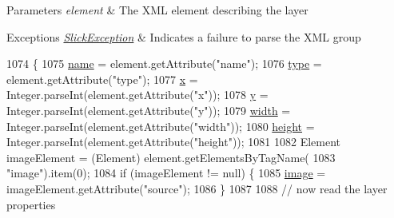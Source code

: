 \begin{DoxyParams}{Parameters}
{\em element} & The X\+ML element describing the layer \\
\hline
\end{DoxyParams}

\begin{DoxyExceptions}{Exceptions}
{\em \mbox{\hyperlink{classorg_1_1newdawn_1_1slick_1_1_slick_exception}{Slick\+Exception}}} & Indicates a failure to parse the X\+ML group \\
\hline
\end{DoxyExceptions}

\begin{DoxyCode}
1074                                                                   \{
1075             \mbox{\hyperlink{classorg_1_1newdawn_1_1slick_1_1tiled_1_1_tiled_map_1_1_group_object_a647061794f0489797202fc8eab87203e}{name}} = element.getAttribute(\textcolor{stringliteral}{"name"});
1076             \mbox{\hyperlink{classorg_1_1newdawn_1_1slick_1_1tiled_1_1_tiled_map_1_1_group_object_a942a05d677b367df56b5ca6e2e914e81}{type}} = element.getAttribute(\textcolor{stringliteral}{"type"});
1077             \mbox{\hyperlink{classorg_1_1newdawn_1_1slick_1_1tiled_1_1_tiled_map_1_1_group_object_a0d11ce828b2e7773a4cc53ad06c20e4e}{x}} = Integer.parseInt(element.getAttribute(\textcolor{stringliteral}{"x"}));
1078             \mbox{\hyperlink{classorg_1_1newdawn_1_1slick_1_1tiled_1_1_tiled_map_1_1_group_object_a071873f26528e4962cfc4fdb552847fa}{y}} = Integer.parseInt(element.getAttribute(\textcolor{stringliteral}{"y"}));
1079             \mbox{\hyperlink{classorg_1_1newdawn_1_1slick_1_1tiled_1_1_tiled_map_1_1_group_object_ada43f94fe097ddcd8f21592cd4a1cb6b}{width}} = Integer.parseInt(element.getAttribute(\textcolor{stringliteral}{"width"}));
1080             \mbox{\hyperlink{classorg_1_1newdawn_1_1slick_1_1tiled_1_1_tiled_map_1_1_group_object_a4d0f25828c9cff534be4ee5c889d6230}{height}} = Integer.parseInt(element.getAttribute(\textcolor{stringliteral}{"height"}));
1081 
1082             Element imageElement = (Element) element.getElementsByTagName(
1083                     \textcolor{stringliteral}{"image"}).item(0);
1084             \textcolor{keywordflow}{if} (imageElement != null) \{
1085                 \mbox{\hyperlink{classorg_1_1newdawn_1_1slick_1_1tiled_1_1_tiled_map_1_1_group_object_a9a9480bd47b25ee7d59fd6ba5b242452}{image}} = imageElement.getAttribute(\textcolor{stringliteral}{"source"});
1086             \}
1087 
1088             \textcolor{comment}{// now read the layer properties}

\end{DoxyCode}
